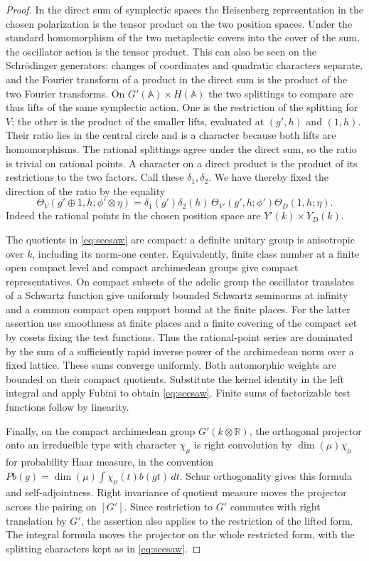 \documentclass[a4paper,11pt]{article}
\theoremstyle{definition}
\theoremstyle{remark}
\newcommand{\RR}{\mathbb R}\newcommand{\CC}{\mathbb C}\newcommand{\QQ}{\mathbb Q}
\numberwithin{equation}{section}
\begin{document}
\begin{proof}
In the direct sum of symplectic spaces the Heisenberg representation in the chosen polarization is the tensor product on the two position spaces. Under the standard homomorphism of the two metaplectic covers into the cover of the sum, the oscillator action is the tensor product. This can also be seen on the Schr\"odinger generators: changes of coordinates and quadratic characters separate, and the Fourier transform of a product in the direct sum is the product of the two Fourier transforms. On \(G'(\mathbb A)\times H(\mathbb A)\) the two splittings to compare are thus lifts of the same symplectic action. One is the restriction of the splitting for \(V\); the other is the product of the smaller lifts, evaluated at \((g',h)\) and \((1,h)\). Their ratio lies in the central circle and is a character because both lifts are homomorphisms. The rational splittings agree under the direct sum, so the ratio is trivial on rational points. A character on a direct product is the product of its restrictions to the two factors. Call these \(\delta_1,\delta_2\). We have thereby fixed the direction of the ratio by the equality
\[
 \Theta_V(g'\oplus1,h;\phi'\otimes\eta)
  =\delta_1(g')\delta_2(h)\,
           \Theta_{V'}(g',h;\phi')\Theta_D(1,h;\eta).
\]
Indeed the rational points in the chosen position space are \(Y'(k)\times Y_D(k)\).

The quotients in \eqref{eq:seesaw} are compact: a definite unitary group is anisotropic over \(k\), including its norm-one center. Equivalently, finite class number at a finite open compact level and compact archimedean groups give compact representatives. On compact subsets of the adelic group the oscillator translates of a Schwartz function give uniformly bounded Schwartz seminorms at infinity and a common compact open support bound at the finite places. For the latter assertion use smoothness at finite places and a finite covering of the compact set by cosets fixing the test functions. Thus the rational-point series are dominated by the sum of a sufficiently rapid inverse power of the archimedean norm over a fixed lattice. These sums converge uniformly. Both automorphic weights are bounded on their compact quotients. Substitute the kernel identity in the left integral and apply Fubini to obtain \eqref{eq:seesaw}. Finite sums of factorizable test functions follow by linearity.

Finally, on the compact archimedean group \(G'(k\otimes\RR)\), the orthogonal projector onto an irreducible type with character \(\chi_\mu\) is right convolution by \(\dim(\mu)\overline{\chi_\mu}\) for probability Haar measure, in the convention \(P b(g)=\dim(\mu)\int\overline{\chi_\mu(t)}b(gt)\,dt\). Schur orthogonality gives this formula and self-adjointness. Right invariance of quotient measure moves the projector across the pairing on \([G']\). Since restriction to \(G'\) commutes with right translation by \(G'\), the assertion also applies to the restriction of the lifted form. The integral formula moves the projector on the whole restricted form, with the splitting characters kept as in \eqref{eq:seesaw}.
\end{proof}
\end{document}
